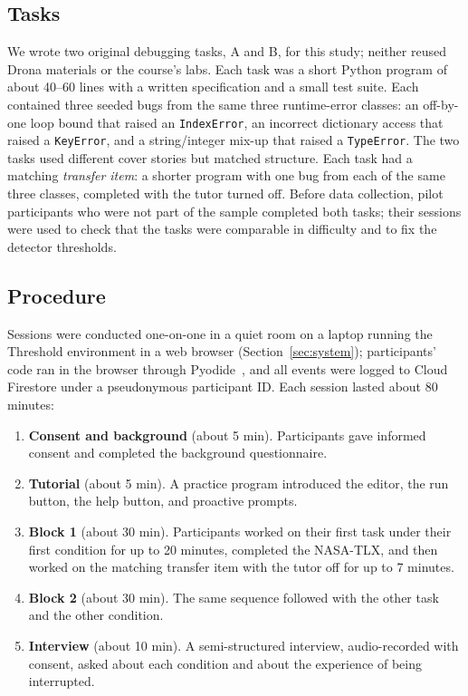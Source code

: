\documentclass[manuscript,review]{acmart}
\begin{document}
\subsection{Tasks}
\label{sec:tasks}
We wrote two original debugging tasks, A and B, for this study; neither reused Drona materials or the course's labs. Each task was a short Python program of about 40--60 lines with a written specification and a small test suite. Each contained three seeded bugs from the same three runtime-error classes: an off-by-one loop bound that raised an \texttt{IndexError}, an incorrect dictionary access that raised a \texttt{KeyError}, and a string/integer mix-up that raised a \texttt{TypeError}. The two tasks used different cover stories but matched structure. Each task had a matching \emph{transfer item}: a shorter program with one bug from each of the same three classes, completed with the tutor turned off. Before data collection, pilot participants who were not part of the sample completed both tasks; their sessions were used to check that the tasks were comparable in difficulty and to fix the detector thresholds.

\subsection{Procedure}
Sessions were conducted one-on-one in a quiet room on a laptop running the Threshold environment in a web browser (Section~\ref{sec:system}); participants' code ran in the browser through Pyodide~\cite{pyodide}, and all events were logged to Cloud Firestore under a pseudonymous participant ID. Each session lasted about 80 minutes:
\begin{enumerate}
  \item \textbf{Consent and background} (about 5 min). Participants gave informed consent and completed the background questionnaire.
  \item \textbf{Tutorial} (about 5 min). A practice program introduced the editor, the run button, the help button, and proactive prompts.
  \item \textbf{Block 1} (about 30 min). Participants worked on their first task under their first condition for up to 20 minutes, completed the NASA-TLX, and then worked on the matching transfer item with the tutor off for up to 7 minutes.
  \item \textbf{Block 2} (about 30 min). The same sequence followed with the other task and the other condition.
  \item \textbf{Interview} (about 10 min). A semi-structured interview, audio-recorded with consent, asked about each condition and about the experience of being interrupted.
\end{enumerate}
\end{document}
